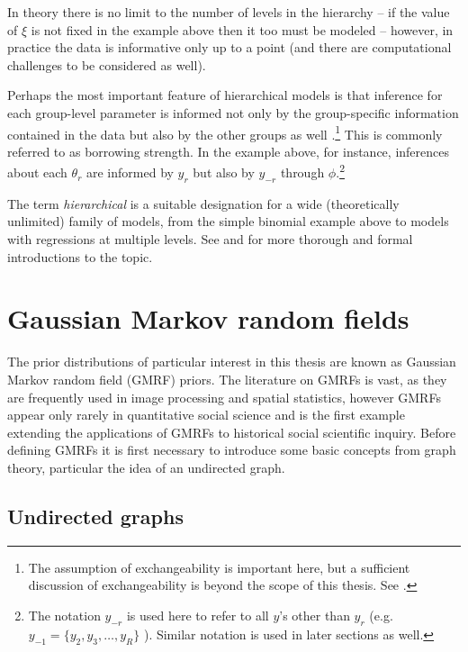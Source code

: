 In theory there is no limit to the number of levels in the hierarchy -- if the value of $\xi$ is not fixed in the example above then it too must be modeled -- however, in practice the data is informative only up to a point (and there are computational challenges to be considered as well). 

Perhaps the most important feature of hierarchical models is that inference for each group-level parameter is informed not only by the group-specific information contained in the data but also by the other groups as well .\footnote{The assumption of exchangeability is important here, but a sufficient discussion of exchangeability is beyond the scope of this thesis. See .} This is commonly referred to as borrowing strength. In the example above, for instance, inferences about each $\theta_r$ are informed by $y_r$ but also by $y_{-r}$ through $\phi$.\footnote{The notation $y_{-r}$ is used here to refer to all $y$'s other than $y_r$ (e.g. $y_{-1} =  \{y_2, y_3, \dots, y_R\}$ ). Similar notation is used in later sections as well. } 

The term {\it hierarchical} is a suitable designation for a wide (theoretically unlimited) family of models, from the simple binomial example above to models with regressions at multiple levels. See  and  for more thorough and formal introductions to the topic.  




\section{Gaussian Markov random fields}
\label{gmrf}

The prior distributions of particular interest in this thesis are known as Gaussian Markov random field (GMRF) priors. The literature on GMRFs is vast, as they are frequently used in image processing and spatial statistics, however  GMRFs appear only rarely in quantitative social science and  is the first example extending the applications of GMRFs to historical social scientific inquiry. Before defining GMRFs it is first necessary to introduce some basic concepts from graph theory, particular the idea of an undirected graph. 

\subsection{Undirected graphs}
\label{undirected_graphs}

